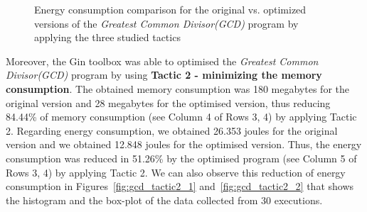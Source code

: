 \begin{figure}
{}
\caption{Energy consumption comparison for the original vs. optimized versions of the \textit{Greatest Common Divisor(GCD)} program by applying the three studied tactics}
\label{fig:graphsGCD}
\end{figure}

\vspace{.5em}
Moreover, the Gin toolbox was able to optimised the \textit{Greatest Common Divisor(GCD)} program by using \textbf{Tactic 2 - minimizing the memory consumption}. The obtained memory consumption was 180 megabytes for the original version and 28 megabytes for the optimised version, thus reducing 84.44\% of memory consumption (see Column 4 of Rows 3, 4) by applying Tactic 2. Regarding energy consumption, we obtained 26.353 joules for the original version and we obtained 12.848 joules for the optimised version. Thus, the energy consumption was reduced in 51.26\% by the optimised program (see Column 5 of Rows 3, 4) by applying Tactic 2.
We can also observe this reduction of energy consumption in Figures~\ref{fig:gcd_tactic2_1} and~\ref{fig:gcd_tactic2_2} that shows the histogram and the box-plot of the data collected from 30 executions.

